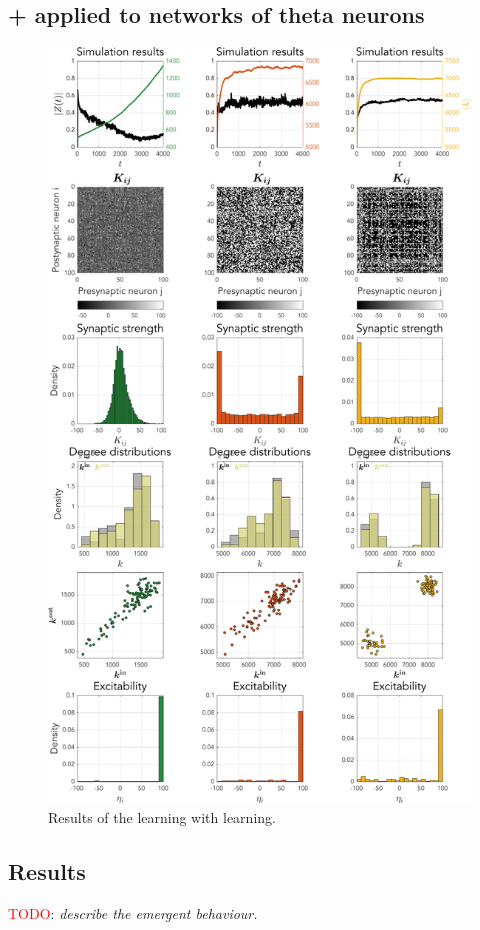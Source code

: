 \subsection{\STDP + \IP applied to networks of theta neurons}
\begin{figure}[H]
\centering
\includegraphics[height = \textheight]{../Figures/Learning/STDPandIP.pdf}
\caption{Results of the \STDP learning with \IP learning.}
\label{fig:STDP}
\end{figure}

\subsection{Results}
\textcolor{red}{TODO}: \textsl{describe the emergent behaviour.}

